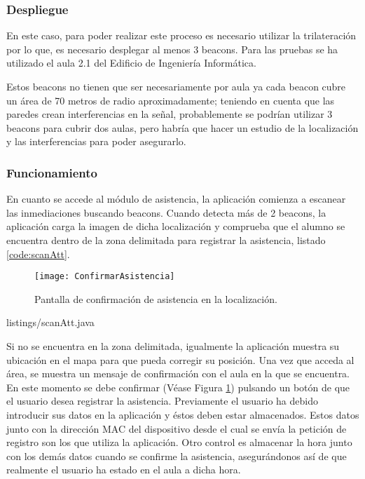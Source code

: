\subsubsection{Despliegue}

En este caso, para poder realizar este proceso es necesario utilizar la trilateración \cite{URL::trilateracion} por lo que, es necesario desplegar al menos 3 beacons. Para las pruebas se ha utilizado el aula 2.1 del Edificio de Ingeniería Informática. 

\vspace{5mm}

Estos beacons no tienen que ser necesariamente por aula ya cada beacon cubre un área de 70 metros de radio aproximadamente; teniendo en cuenta que las paredes crean interferencias en la señal, probablemente se podrían utilizar 3 beacons para cubrir dos aulas, pero habría que hacer un estudio de la localización y las interferencias para poder asegurarlo. 

\subsubsection{Funcionamiento}

En cuanto se accede al módulo de asistencia, la aplicación comienza a escanear las inmediaciones buscando beacons. Cuando detecta más de 2 beacons, la aplicación carga la imagen de dicha localización y comprueba que el alumno se encuentra dentro de la zona delimitada para registrar la asistencia, listado \ref{code:scanAtt}.

\begin{figure}[H]
	\centering
	\texttt{[image: ConfirmarAsistencia]}
	\caption{Pantalla de confirmación de asistencia en la localización.}
	\label{fig:confirmarAsistencia}
\end{figure}


{listings/scanAtt.java} %

\vspace{10mm}

Si no se encuentra en la zona delimitada, igualmente la aplicación muestra su ubicación en el mapa para que pueda corregir su posición. Una vez que acceda al área, se muestra un mensaje de confirmación con el aula en la que se encuentra. En este momento se debe confirmar (Véase Figura \ref{fig:confirmarAsistencia}) pulsando un botón de que el usuario desea registrar la asistencia. Previamente el usuario ha debido introducir sus datos en la aplicación y éstos deben estar almacenados. Estos datos junto con la dirección MAC del dispositivo desde el cual se envía la petición de registro son los que utiliza la aplicación. Otro control es almacenar la hora junto con los demás datos cuando se confirme la asistencia, asegurándonos así de que realmente el usuario ha estado en el aula a dicha hora.


